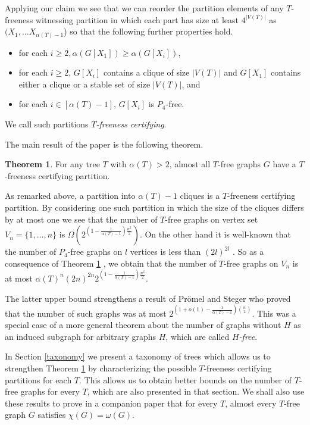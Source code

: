 \documentclass[12pt]{article}
\theoremstyle{definition}
\newtheorem{theorem}{Theorem}[section]
\begin{document}
Applying our claim  we see that we can reorder  the partition elements of any $T$-freeness witnessing  partition in which each part has size at least $4^{|V(T)|}$ as  $(X_1,\ldots X_{\alpha(T)-1}$) so that the following further  properties hold. 


\begin{itemize}
\item[(i)] for each $i\ge 2, \alpha(G[X_1]) \ge \alpha(G[X_i])$, 
\item[(ii)] for each $i\ge 2$, $G[X_i]$ contains a clique of size $|V(T)|$ and $G[X_1]$ contains either a clique or a stable set  of size $|V(T)|$, and 
\item[(iii)] for each $i\in [\alpha(T)-1]$, $G[X_i]$ is $P_4$-free.
\end{itemize} 

We call such partitions {\it $T$-freeness certifying}. 

The main result of the paper is the following theorem. 

\begin{theorem}\label{main}
For any tree $T$ with $\alpha(T)>2$,  almost all $T$-free graphs $G$ have a $T$-freeness certifying partition. 
\end{theorem}


As remarked above,  a  partition into $\alpha(T)-1$ cliques is a  $T$-freeness certifying partition. By considering 
one such partition in which the size of the cliques differs by at most one we see that 
the number of $T$-free graphs on vertex set $V_n=\{1,...,n\}$ is 
$\Omega\left(2^{\left(1 -\frac{1}{\alpha(T)-1}\right)\frac{n^2}{2}}\right)$. On the other hand it is  well-known that  the 
number of $P_4$-free graphs on $l$ vertices is less than $(2l)^{2l}$ \cite{S74}. So as a consequence of 
Theorem \ref{main} , we obtain that the number of $T$-free graphs on $V_n$ is at most 
$\alpha(T)^n(2n)^{2n}2^{\left(1 -\frac{1}{\alpha(T)-1}\right)\frac{n^2}{2}}$. 

The latter upper bound strengthens a result of Pr{\"o}mel and Steger \cite{PS92} who proved that the number of 
such graphs was at most $2^{\left(1+o(1) -\frac{1}{\alpha(T)-1}\right){n \choose 2}}$. This was a special case of 
a more general theorem about the number of graphs without $H$ as an induced subgraph for 
arbitrary graphs $H$, which are called \textit{$H$-free}. 

In Section \ref{taxonomy} we present a  taxonomy of trees which allows us to  strengthen Theorem \ref{main}
by characterizing the possible $T$-freeness certifying partitions for each $T$.  
This allows us to obtain better  bounds on the number of $T$-free graphs for every $T$, which are also presented  in that section. 
We  shall also use these  results to prove in a companion paper that for every $T$,
almost every $T$-free graph $G$ satisfies $\chi(G)=\omega(G)$.  
\end{document}
